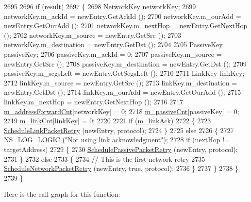 \begin{DoxyCode}
2695 
2696   \textcolor{keywordflow}{if} (result)
2697     \{
2698       NetworkKey networkKey;
2699       networkKey.m\_ackId = newEntry.GetAckId ();
2700       networkKey.m\_ourAdd = newEntry.GetOurAdd ();
2701       networkKey.m\_nextHop = newEntry.GetNextHop ();
2702       networkKey.m\_source = newEntry.GetSrc ();
2703       networkKey.m\_destination = newEntry.GetDst ();
2704 
2705       PassiveKey passiveKey;
2706       passiveKey.m\_ackId = 0;
2707       passiveKey.m\_source = newEntry.GetSrc ();
2708       passiveKey.m\_destination = newEntry.GetDst ();
2709       passiveKey.m\_segsLeft = newEntry.GetSegsLeft ();
2710 
2711       LinkKey linkKey;
2712       linkKey.m\_source = newEntry.GetSrc ();
2713       linkKey.m\_destination = newEntry.GetDst ();
2714       linkKey.m\_ourAdd = newEntry.GetOurAdd ();
2715       linkKey.m\_nextHop = newEntry.GetNextHop ();
2716 
2717       \hyperlink{classns3_1_1dsr_1_1DsrRouting_a5042f7e5df0470025fdb6023fcc24411}{m\_addressForwardCnt}[networkKey] = 0;
2718       \hyperlink{classns3_1_1dsr_1_1DsrRouting_a7fec404d680459aab2b40941a950502d}{m\_passiveCnt}[passiveKey] = 0;
2719       \hyperlink{classns3_1_1dsr_1_1DsrRouting_a85ba159639f9bc13b3d8890458128a79}{m\_linkCnt}[linkKey] = 0;
2720 
2721       \textcolor{keywordflow}{if} (\hyperlink{classns3_1_1dsr_1_1DsrRouting_a216a52d8b579a034df948765d941d3a4}{m\_linkAck})
2722         \{
2723           \hyperlink{classns3_1_1dsr_1_1DsrRouting_a947d831bc0964240b1a41b3a09832eff}{ScheduleLinkPacketRetry} (newEntry, protocol);
2724         \}
2725       \textcolor{keywordflow}{else}
2726         \{
2727           \hyperlink{group__logging_ga88acd260151caf2db9c0fc84997f45ce}{NS\_LOG\_LOGIC} (\textcolor{stringliteral}{"Not using link acknowledgment"});
2728           \textcolor{keywordflow}{if} (nextHop != targetAddress)
2729             \{
2730               \hyperlink{classns3_1_1dsr_1_1DsrRouting_abfdfa37822a492971fdf24540b635039}{SchedulePassivePacketRetry} (newEntry, protocol);
2731             \}
2732           \textcolor{keywordflow}{else}
2733             \{
2734               \textcolor{comment}{// This is the first network retry}
2735               \hyperlink{classns3_1_1dsr_1_1DsrRouting_a6a18c6baa374d5e6a68f8952d1afdb13}{ScheduleNetworkPacketRetry} (newEntry, \textcolor{keyword}{true}, protocol);
2736             \}
2737         \}
2738     \}
2739 \}
\end{DoxyCode}


Here is the call graph for this function\+:


